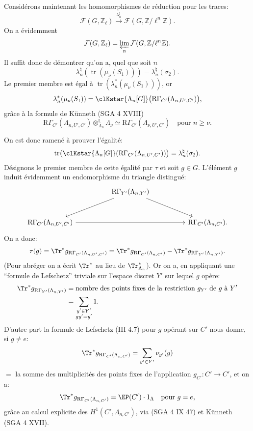 Considérons maintenant les homomorphismes de réduction pour les traces:
\[
\mathcal{F}(G,\mathbb{Z}_\ell)\xrightarrow{\lambda_n^\natural}\mathcal{F}(G,\mathbb{Z}/\ell^n\mathbb{Z}).
\]
On a évidemment
\[
\mathcal{F}(G,\mathbb{Z}_\ell)=\varprojlim_n\mathcal{F}(G,\mathbb{Z}/\ell^n\mathbb{Z}).
\]
Il suffit donc de démontrer qu'on a, quel que soit $n$
\[
\lambda_n^\natural(\operatorname{tr}(\mu_\nu(S_1)))=\lambda_n^\natural(\sigma_2).
\]
Le premier membre est égal à $\operatorname{tr}(\lambda_n^*(\mu_\nu(S_1)))$, or
\[
\lambda_n^*(\mu_\nu(S_1))
=
\clKstar{\Lambda_n[G]}\bigl(\mathrm{R}\Gamma_{C'}(\Lambda_{n,U',C'})\bigr),
\]
grâce à la formule de Künneth (SGA 4 XVIII)
\[
\mathrm{R}\Gamma_{C'}(\Lambda_{n,U',C'})\otimes_{\Lambda_n}^{\mathbb{L}}\Lambda_\nu
\simeq \mathrm{R}\Gamma_{C'}(\Lambda_{\nu,U',C'})
\quad\text{pour } n\ge\nu.
\]

On est donc ramené à prouver l'égalité:
\[
\operatorname{tr}\bigl(\clKstar{\Lambda_n[G]}(\mathrm{R}\Gamma_{C'}(\Lambda_{n,U',C'}))\bigr)
=
\lambda_n^\natural(\sigma_2).
\]
Désignons le premier membre de cette égalité par $\tau$ et soit $g\in G$. L'élément $g$ induit évidemment un endomorphisme du triangle distingué:
\[
\begin{tikzcd}[column sep=huge,row sep=large]
& \mathrm{R}\Gamma_{Y'}(\Lambda_{n,Y'}) \arrow[dl] \arrow[dr] & \\
\mathrm{R}\Gamma_{C'}(\Lambda_{n,U',C'}) \arrow[rr] && \mathrm{R}\Gamma_{C'}(\Lambda_{n,C'}).
\end{tikzcd}
\]
On a donc:
\[
\tau(g)=\Tr^*g_{\mathrm{R}\Gamma_{C'}(\Lambda_{n,U',C'})}
=\Tr^*g_{\mathrm{R}\Gamma_{C'}(\Lambda_{n,C'})}
-\Tr^*g_{\mathrm{R}\Gamma_{Y'}(\Lambda_{n,Y'})}.
\]
(Pour abréger on a écrit $\Tr^*$ au lieu de $\Tr^*_{\Lambda_n}$). Or on a, en appliquant une ``formule de Lefschetz'' triviale sur l'espace discret $Y'$ sur lequel $g$ opère:
\[
\begin{aligned}
\Tr^*g_{\mathrm{R}\Gamma_{Y'}(\Lambda_{n,Y'})}
&=\text{nombre des points fixes de la restriction } g_{Y'} \text{ de } g \text{ à } Y'\\
&=\sum_{\substack{y'\in Y'\\gy'=y'}}1.
\end{aligned}
\]
D'autre part la formule de Lefschetz (III 4.7) pour $g$ opérant sur $C'$ nous donne, si $g\ne e$:
\[
\Tr^*g_{\mathrm{R}\Gamma_{C'}(\Lambda_{n,C'})}
=
\sum_{y'\in Y'} \nu_{y'}(g)
\]
$=$ la somme des multiplicités des points fixes de l'application $g_{C'}:C'\to C'$, et on a:
\[
\Tr^*g_{\mathrm{R}\Gamma_{C'}(\Lambda_{n,C'})}=\EP(C')\cdot1_\Lambda
\quad\text{pour }g=e,
\]
grâce au calcul explicite des $H^1(C',\Lambda_{n,C'})$, via (SGA 4 IX 47) et
Künneth (SGA 4 XVII).

